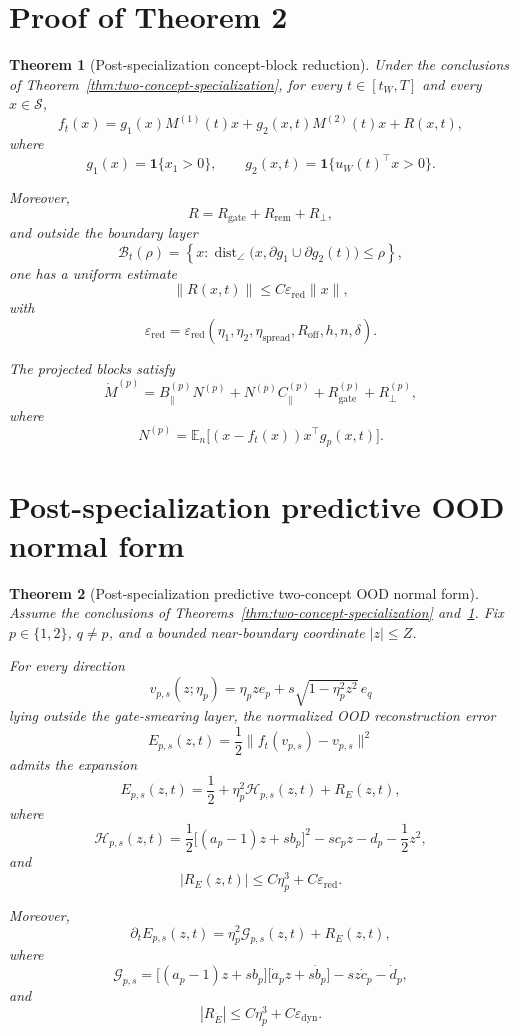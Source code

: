 \documentclass{article} %
\theoremstyle{plain}
\newtheorem{theorem}{Theorem}[section]
\theoremstyle{definition}
\theoremstyle{remark}
\begin{document}
\section{Proof of Theorem 2}

\begin{theorem}[Post-specialization concept-block reduction]
\label{thm:block-reduction}
Under the conclusions of
Theorem~\ref{thm:two-concept-specialization}, for every
\(t\in[t_W,T]\) and every \(x\in\mathcal S\),
\[
f_t(x)
=
g_1(x)M^{(1)}(t)x
+
g_2(x,t)M^{(2)}(t)x
+
R(x,t),
\]
where
\[
g_1(x)=\mathbf 1\{x_1>0\},
\qquad
g_2(x,t)=\mathbf 1\{u_W(t)^\top x>0\}.
\]

Moreover,
\[
R
=
R_{\mathrm{gate}}
+
R_{\mathrm{rem}}
+
R_{\perp},
\]
and outside the boundary layer
\[
\mathcal B_t(\rho)
=
\left\{
x:
\operatorname{dist}_{\angle}
\bigl(x,\partial g_1\cup\partial g_2(t)\bigr)
\le \rho
\right\},
\]
one has a uniform estimate
\[
\|R(x,t)\|
\le
C\varepsilon_{\mathrm{red}}\|x\|,
\]
with
\[
\varepsilon_{\mathrm{red}}
=
\varepsilon_{\mathrm{red}}
(\eta_1,\eta_2,\eta_{\mathrm{spread}},
R_{\mathrm{off}},h,n,\delta).
\]

The projected blocks satisfy
\[
\dot M^{(p)}
=
B_\parallel^{(p)}N^{(p)}
+
N^{(p)}C_\parallel^{(p)}
+
R_{\mathrm{gate}}^{(p)}
+
R_\perp^{(p)},
\]
where
\[
N^{(p)}
=
\mathbb E_n
\bigl[
(x-f_t(x))x^\top g_p(x,t)
\bigr].
\]
\end{theorem}

\section{Post-specialization predictive OOD normal form}

\begin{theorem}[Post-specialization predictive two-concept OOD normal form]
\label{thm:swingby}
Assume the conclusions of
Theorems~\ref{thm:two-concept-specialization}
and~\ref{thm:block-reduction}.
Fix \(p\in\{1,2\}\), \(q\neq p\), and a bounded near-boundary coordinate
\(|z|\le Z\).

For every direction
\[
v_{p,s}(z;\eta_p)
=
\eta_p z e_p
+
s\sqrt{1-\eta_p^2z^2}\,e_q
\]
lying outside the gate-smearing layer, the normalized OOD reconstruction
error
\[
E_{p,s}(z,t)
=
\frac12\|f_t(v_{p,s})-v_{p,s}\|^2
\]
admits the expansion
\[
E_{p,s}(z,t)
=
\frac12
+
\eta_p^2\mathcal H_{p,s}(z,t)
+
R_E(z,t),
\]
where
\[
\mathcal H_{p,s}(z,t)
=
\frac12
\bigl[(a_p-1)z+s b_p\bigr]^2
-
s c_p z
-
d_p
-
\frac12 z^2,
\]
and
\[
|R_E(z,t)|
\le
C\eta_p^3
+
C\varepsilon_{\mathrm{red}}.
\]

Moreover,
\[
\partial_t E_{p,s}(z,t)
=
\eta_p^2\mathcal G_{p,s}(z,t)
+
R_{\dot E}(z,t),
\]
where
\[
\mathcal G_{p,s}
=
\bigl[(a_p-1)z+s b_p\bigr]
\bigl[\dot a_p z+s\dot b_p\bigr]
-
s z\dot c_p
-
\dot d_p,
\]
and
\[
|R_{\dot E}|
\le
C\eta_p^3
+
C\varepsilon_{\mathrm{dyn}}.
\]

\end{theorem}
\end{document}
